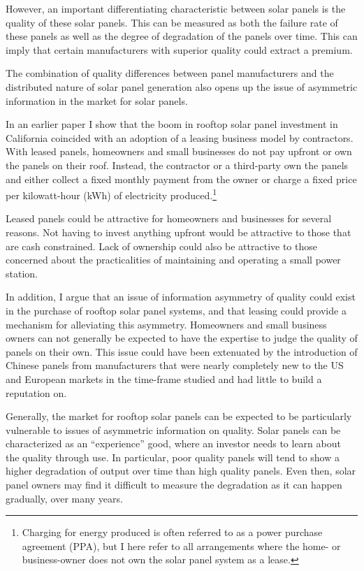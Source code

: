 \documentclass[12pt]{article}
\begin{document}
However, an important differentiating characteristic between solar panels is the quality of these solar panels. This can be measured as both the failure rate of these panels as well as the degree of degradation of the panels over time. This can imply that certain manufacturers with superior quality could extract a premium.

The combination of quality differences between panel manufacturers and the distributed nature of solar panel generation also opens up the issue of asymmetric information in the market for solar panels. 

In an earlier paper \citep{mauritzen_whats_2015} I show that the boom in rooftop solar panel investment in California coincided with an adoption of a leasing business model by contractors. With leased panels, homeowners and small businesses do not pay upfront or own the panels on their roof. Instead, the contractor or a third-party own the panels and either collect a fixed monthly payment from the owner or charge a fixed price per kilowatt-hour (kWh) of electricity produced.\footnote{Charging for energy produced is often referred to as a power purchase agreement (PPA), but I here refer to all arrangements where the home- or business-owner does not own the solar panel system as a lease.}

Leased panels could be attractive for homeowners and businesses for several reasons. Not having to invest anything upfront would be attractive to those that are cash constrained. Lack of ownership could also be attractive to those concerned about the practicalities of maintaining and operating a small power station.

In addition, I argue that an issue of information asymmetry of quality could exist in the purchase of rooftop solar panel systems, and that leasing could provide a mechanism for alleviating this asymmetry. Homeowners and small business owners can not generally be expected to have the expertise to judge the quality of panels on their own. This issue could have been extenuated by the introduction of Chinese panels from manufacturers that were nearly completely new to the US and European markets in the time-frame studied and had little to build a reputation on.

Generally, the market for rooftop solar panels can be expected to be particularly vulnerable to issues of asymmetric information on quality. Solar panels can be characterized as an ``experience'' good, where an investor needs to learn about the quality through use. In particular, poor quality panels will tend to show a higher degradation of output over time than high quality panels. Even then, solar panel owners may find it difficult to measure the degradation as it can happen gradually, over many years.
\end{document}
